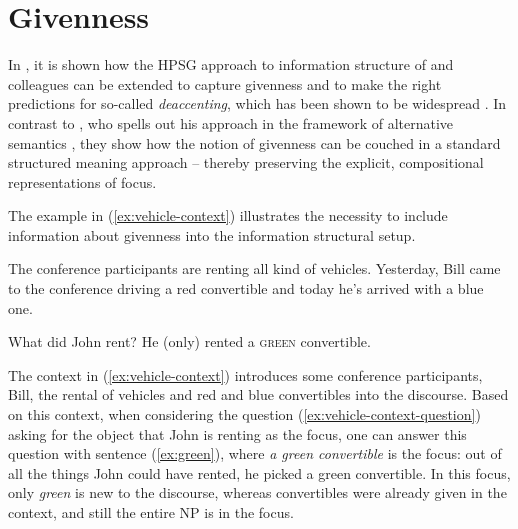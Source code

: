 \documentclass[output=paper]{langsci/langscibook}
\begin{document}
\section{Givenness}
\label{sec:givenness}

In \cite{DeKuthy.Meurers-11}, it is shown how
the HPSG approach to information structure of \cite{deKuthy2002a} and
colleagues can be extended to capture givenness and to make the right
predictions for so-called \emph{deaccenting}, which has been shown to be
widespread \citep{buering:06}.  In contrast to
\cite{Schwarzschild99a-u}, who spells out his approach in the framework
of alternative semantics \citep{Rooth92a-u}, they show how the notion of
givenness can be couched in a standard structured meaning approach --
thereby preserving the explicit, compositional representations of focus.

The example in (\ref{ex:vehicle-context}) illustrates the necessity
to include information about givenness into the information structural
setup.

\begin{exe}
  \ex\label{ex:vehicle-context} The conference participants are
  renting all kind of vehicles.  Yesterday, Bill came to the
  conference driving a red convertible and today he's arrived with a
  blue one. \begin{xlist} \ex\label{ex:vehicle-context-question} What did John rent?
    \ex\label{ex:green} He (only) rented {\LF}a \textsc{green}
    convertible{\RF}.
  \end{xlist}
\end{exe}


The context in (\ref{ex:vehicle-context}) introduces some conference participants, Bill, the rental of
vehicles and red and blue convertibles into the discourse.  Based on
this context, when considering the question
(\ref{ex:vehicle-context-question}) asking for the object that John is
renting as the focus, one can  answer this question with sentence (\ref{ex:green}), where
\textit{a green convertible} is the focus: out of all the things John
could have rented, he picked a green convertible. In this focus, only
\textit{green} is new to the discourse, whereas convertibles were
already given in the context, and still the entire NP is in the focus.
\end{document}
